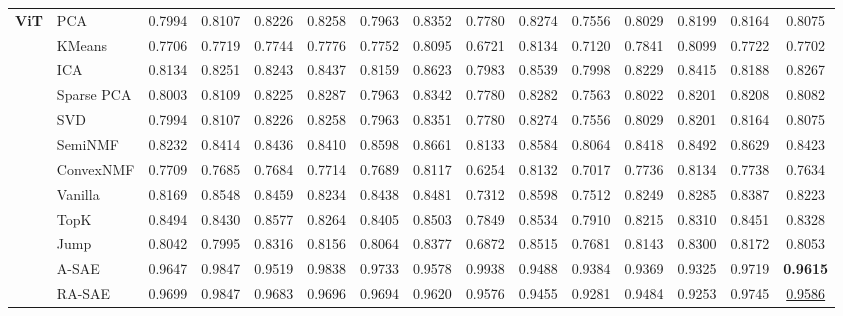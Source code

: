 \begin{table*}[h!]
{{\begin{tabular}{ll|cccccccccccc|c}
\multirow{8}{*}{\textbf{ViT}} 
& PCA         & 0.7994 & 0.8107 & 0.8226 & 0.8258 & 0.7963 & 0.8352 & 0.7780 & 0.8274 & 0.7556 & 0.8029 & 0.8199 & 0.8164 & 0.8075 \\
& KMeans      & 0.7706 & 0.7719 & 0.7744 & 0.7776 & 0.7752 & 0.8095 & 0.6721 & 0.8134 & 0.7120 & 0.7841 & 0.8099 & 0.7722 & 0.7702 \\
& ICA         & 0.8134 & 0.8251 & 0.8243 & 0.8437 & 0.8159 & 0.8623 & 0.7983 & 0.8539 & 0.7998 & 0.8229 & 0.8415 & 0.8188 & 0.8267 \\
& Sparse PCA  & 0.8003 & 0.8109 & 0.8225 & 0.8287 & 0.7963 & 0.8342 & 0.7780 & 0.8282 & 0.7563 & 0.8022 & 0.8201 & 0.8208 & 0.8082 \\
& SVD         & 0.7994 & 0.8107 & 0.8226 & 0.8258 & 0.7963 & 0.8351 & 0.7780 & 0.8274 & 0.7556 & 0.8029 & 0.8201 & 0.8164 & 0.8075 \\
& SemiNMF     & 0.8232 & 0.8414 & 0.8436 & 0.8410 & 0.8598 & 0.8661 & 0.8133 & 0.8584 & 0.8064 & 0.8418 & 0.8492 & 0.8629 & 0.8423 \\
& ConvexNMF   & 0.7709 & 0.7685 & 0.7684 & 0.7714 & 0.7689 & 0.8117 & 0.6254 & 0.8132 & 0.7017 & 0.7736 & 0.8134 & 0.7738 & 0.7634 \\
& Vanilla     & 0.8169 & 0.8548 & 0.8459 & 0.8234 & 0.8438 & 0.8481 & 0.7312 & 0.8598 & 0.7512 & 0.8249 & 0.8285 & 0.8387 & 0.8223 \\
& TopK        & 0.8494 & 0.8430 & 0.8577 & 0.8264 & 0.8405 & 0.8503 & 0.7849 & 0.8534 & 0.7910 & 0.8215 & 0.8310 & 0.8451 & 0.8328 \\
& Jump        & 0.8042 & 0.7995 & 0.8316 & 0.8156 & 0.8064 & 0.8377 & 0.6872 & 0.8515 & 0.7681 & 0.8143 & 0.8300 & 0.8172 & 0.8053 \\
& A-SAE       & 0.9647 & 0.9847 & 0.9519 & 0.9838 & 0.9733 & 0.9578 & 0.9938 & 0.9488 & 0.9384 & 0.9369 & 0.9325 & 0.9719 & \textbf{0.9615} \\
& RA-SAE       & 0.9699 & 0.9847 & 0.9683 & 0.9696 & 0.9694 & 0.9620 & 0.9576 & 0.9455 & 0.9281 & 0.9484 & 0.9253 & 0.9745 & \underline{0.9586} \\
\bottomrule
\end{tabular}
}}
\end{table*}
